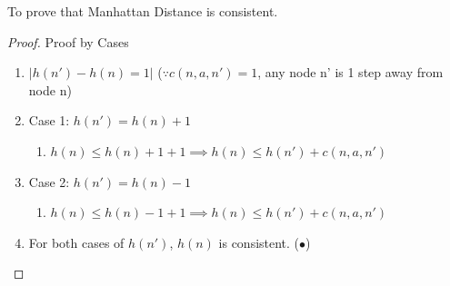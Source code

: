 \documentclass[runningheads]{llncs}
\begin{document}
To prove that Manhattan Distance is consistent.
\begin{proof} Proof by Cases
    \begin{enumerate}
        \item \( |h(n') - h(n) = 1| \) (\( \because c(n, a, n') = 1 \), any node n' is 1 step away from node n)
        \item Case 1: \( h(n') = h(n) + 1 \)
        \begin{enumerate}
            \item \( h(n) \leq h(n) + 1 + 1 \implies h(n) \leq h(n') + c(n, a, n') \)
        \end{enumerate}
        \item Case 2: \( h(n') = h(n) - 1 \)
        \begin{enumerate}
            \item \( h(n) \leq h(n) - 1 + 1 \implies h(n) \leq h(n') + c(n, a, n') \)
        \end{enumerate}
        \item For both cases of \( h(n') \), \( h(n) \) is consistent. (\(\bullet\))
    \end{enumerate}
\end{proof}
\end{document}
